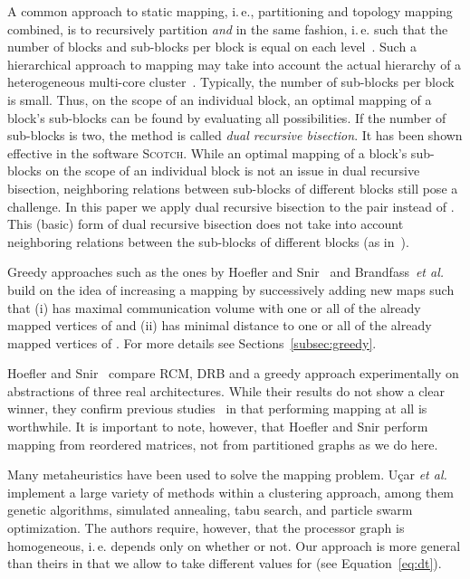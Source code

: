 \documentclass[pdftex]{llncs}
\newcommand{\ie}{i.\,e.\xspace}
\newcommand{\etal}{\textit{et al.}\xspace}
\newcommand{\scotch}{\textsc{Scotch}\xspace}
\begin{document}
A common approach to static mapping, \ie, partitioning and topology
mapping combined, is to recursively partition  \emph{and} 
in the same fashion, \ie such that the number of blocks and sub-blocks
per block is equal on each level~\cite{Pellegrini94static}. Such a
hierarchical approach to mapping may take into account the actual
hierarchy of a heterogeneous multi-core
cluster~\cite{chan2012impact}. Typically, the number of sub-blocks per
block is small. Thus, on the scope of an individual block, an optimal
mapping of a block's sub-blocks can be found by evaluating all
possibilities. If the number of sub-blocks is two, the method is
called \emph{dual recursive bisection}. It has been shown effective in
the software \scotch\cite{Pellegrini07scotch}. While an optimal
mapping of a block's sub-blocks on the scope of an individual block is
not an issue in dual recursive bisection, neighboring relations
between sub-blocks of different blocks still pose a challenge.
In this paper we apply dual recursive bisection to the pair  instead of . This (basic) form of dual recursive
bisection does not take into account neighboring relations between the
sub-blocks of different blocks (as in~\cite{hoefler-topomap}).

Greedy approaches such as the ones by Hoefler and Snir~\cite{hoefler-topomap}
and Brandfass~\etal~\cite{Brandfass2013372} build on the idea of
increasing a mapping by successively adding new maps  such that (i)  has maximal communication volume with one or
all of the already mapped vertices of  and (ii)  has minimal
distance to one or all of the already mapped vertices of . For
more details see Sections~\ref{subsec:greedy}.

Hoefler and Snir~\cite{hoefler-topomap} compare RCM, DRB and a greedy
approach experimentally on abstractions of three real architectures. While their
results do not show a clear winner, they confirm previous
studies~\cite{Pellegrini11static} in that performing mapping at all is
worthwhile.  It is important to note, however, that Hoefler and Snir
perform mapping from reordered matrices, not from partitioned graphs
as we do here.

Many metaheuristics have been used to solve the mapping problem.
U\c{c}ar \etal~\cite{Ucar200632} implement a large variety of methods
within a clustering approach, among them genetic algorithms, simulated
annealing, tabu search, and particle swarm optimization. The authors
require, however, that the processor graph is homogeneous, \ie  depends only on whether  or not. Our approach is more
general than theirs in that we allow  to take different
values for  (see Equation~\ref{eq:dt}). 
\end{document}
